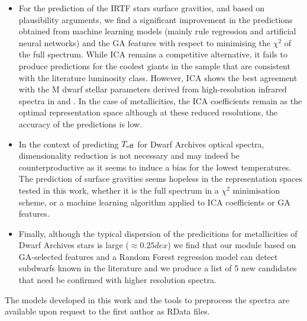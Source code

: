 \begin{itemize}
\item For the prediction of the IRTF stars surface gravities, and
  based on plausibility arguments, we find a significant improvement
  in the predictions obtained from machine learning models (mainly
  rule regression and artificial neural networks) and the GA features
  with respect to minimising the $\chi^2$ of the full spectrum. While
  ICA remains a competitive alternative, it fails to produce
  predictions for the coolest giants in the sample that are consistent
  with the literature luminosity class. However, ICA shows the best
  agreement with the M dwarf stellar parameters derived from
  high-resolution infrared spectra in \cite{esm1} and \cite{esm2}. In
  the case of metallicities, the ICA coefficients remain as the
  optimal representation space although at these reduced resolutions,
  the accuracy of the predictions is low.

\item In the context of predicting $T_{\rm eff}$ for Dwarf Archives
  optical spectra, dimensionality reduction is not necessary and may
  indeed be counterproductive as it seems to induce a bias for the
  lowest temperatures.  The prediction of surface gravities seems
  hopeless in the representation spaces tested in this work, whether
  it is the full spectrum in a $\chi^2$ minimisation scheme, or a
  machine learning algorithm applied to ICA coefficients or GA
  features.

\item Finally, although the typical dispersion of the predicitions for
  metallicities of Dwarf Archives stars is large ($\approx 0.25 dex$)
  we find that our module based on GA-selected features and a Random
  Forest regression model can detect subdwarfs known in the literature
  and we produce a list of 5 new candidates that need be confirmed
  with higher resolution spectra.

\end{itemize}


The models developed in this work and the tools to preprocess the
spectra are available upon request to the first author as RData files.

